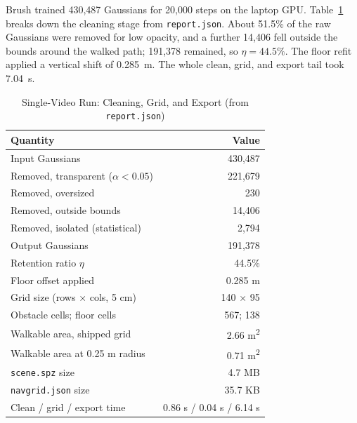 \documentclass[conference]{IEEEtran}
\begin{document}
Brush trained 430,487 Gaussians for 20,000 steps on the laptop GPU. Table~\ref{tab:clean} breaks down the cleaning stage from \texttt{report.json}. About 51.5\% of the raw Gaussians were removed for low opacity, and a further 14,406 fell outside the bounds around the walked path; 191,378 remained, so $\eta = 44.5\%$. The floor refit applied a vertical shift of 0.285~m. The whole clean, grid, and export tail took 7.04~s.

\begin{table}[!htb]
\centering
\footnotesize
\caption{Single-Video Run: Cleaning, Grid, and Export (from \texttt{report.json})}
\label{tab:clean}
\begin{tabular}{p{}r}
\toprule
\textbf{Quantity} & \textbf{Value} \\
\midrule
Input Gaussians & 430,487 \\
Removed, transparent ($\alpha<0.05$) & 221,679 \\
Removed, oversized & 230 \\
Removed, outside bounds & 14,406 \\
Removed, isolated (statistical) & 2,794 \\
Output Gaussians & 191,378 \\
Retention ratio $\eta$ & 44.5\% \\
Floor offset applied & 0.285 m \\
Grid size (rows $\times$ cols, 5 cm) & 140 $\times$ 95 \\
Obstacle cells; floor cells & 567; 138 \\
Walkable area, shipped grid & 2.66 m\textsuperscript{2} \\
Walkable area at 0.25 m radius & 0.71 m\textsuperscript{2} \\
\texttt{scene.spz} size & 4.7 MB \\
\texttt{navgrid.json} size & 35.7 KB \\
Clean / grid / export time & 0.86 s / 0.04 s / 6.14 s \\
\bottomrule
\end{tabular}
\end{table}
\end{document}
